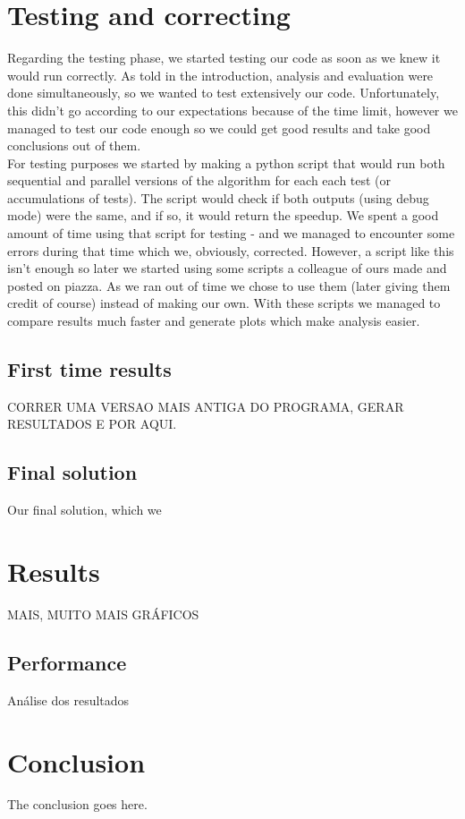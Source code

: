 \documentclass[10pt,journal,compsoc]{IEEEtran}
\begin{document}
\section{Testing and correcting}
Regarding the testing phase, we started testing our code as soon as we knew it would run correctly. As told in the introduction, analysis and evaluation were done simultaneously, so we wanted to test extensively our code. Unfortunately, this didn't go according to our expectations because of the time limit, however we managed to test our code enough so we could get good results and take good conclusions out of them.
\\
For testing purposes we started by making a python script that would run both sequential and parallel versions of the algorithm for each each test (or accumulations of tests). The script would check if both outputs (using debug mode) were the same, and if so, it would return the speedup. We spent a good amount of time using that script for testing - and we managed to encounter some errors during that time which we, obviously, corrected. However, a script like this isn't enough so later we started using some scripts a colleague of ours made and posted on piazza. As we ran out of time we chose to use them (later giving them credit of course) instead of making our own. With these scripts we managed to compare results much faster and generate plots which make analysis easier.

\subsection{First time results}
CORRER UMA VERSAO MAIS ANTIGA DO PROGRAMA, GERAR RESULTADOS E POR AQUI.


\subsection{Final solution}
Our final solution, which we 

\section{Results}
MAIS, MUITO MAIS GRÁFICOS

\subsection{Performance}
Análise dos resultados


\section{Conclusion}
The conclusion goes here.
\end{document}
